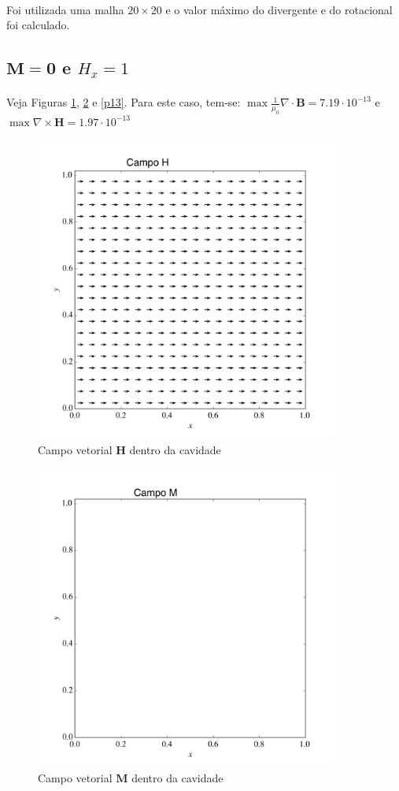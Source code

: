 \documentclass[a4paper,11pt]{article}
\begin{document}
\paragraph{} Foi utilizada uma malha $20\times 20$ e o valor máximo do divergente e do rotacional foi calculado.
\subsection{$\mathbf{M} = \mathbf{0}$ e $H_x = 1$}

\paragraph{} Veja Figuras \ref{p11}, \ref{p12} e \ref{p13}. Para este caso, tem-se: $\max \frac{1}{\mu_0}\nabla\cdot \mathbf{B}  = 7.19\cdot 10^{-13}$ e $\max \nabla\times \mathbf{H}  =1.97\cdot 	10^{-13}$


\begin{figure}[!ht]
\centering
\includegraphics[width=10cm]{img/Hproblem0.png}
\caption{Campo vetorial $\mathbf{H}$ dentro da cavidade\label{p11}}
\end{figure}

\begin{figure}[!ht]
\centering
\includegraphics[width=10cm]{img/Mproblem0.png}
\caption{Campo vetorial $\mathbf{M}$ dentro da cavidade\label{p12}}
\end{figure}
\end{document}
